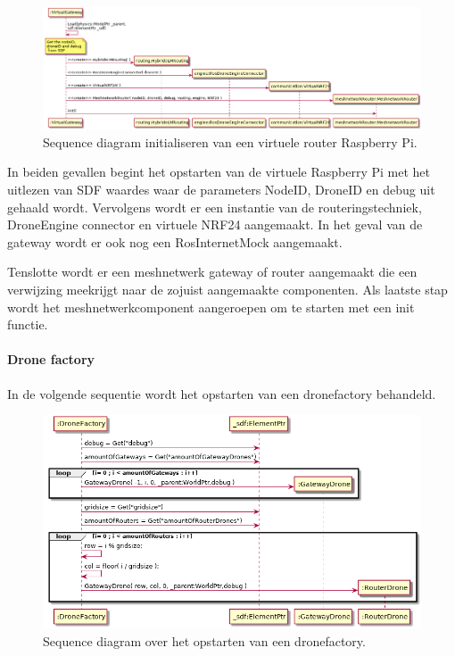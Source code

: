\documentclass[a4paper, 11pt, oneside]{report}
\begin{document}
\begin{figure}[H]
	\begin{center}\includegraphics[width=.90\linewidth]{UML/out/DroneSimulation/Sequence/VirtualRouter/VirtualRouter.png}\end{center}
	\caption{Sequence diagram initialiseren van een virtuele router Raspberry Pi.}
	\label{fig:communication:MeshNetwerk:sequence:routerRaspberryPi}
\end{figure}

In beiden gevallen begint het opstarten van de virtuele Raspberry Pi met het uitlezen van SDF waardes waar de parameters NodeID, DroneID en debug uit gehaald wordt.
Vervolgens wordt er een instantie van de routeringstechniek, DroneEngine connector en virtuele NRF24 aangemaakt.
In het geval van de gateway wordt er ook nog een RosInternetMock aangemaakt.

Tenslotte wordt er een meshnetwerk gateway of router aangemaakt die een verwijzing meekrijgt naar de zojuist aangemaakte componenten.
Als laatste stap wordt het meshnetwerkcomponent aangeroepen om te starten met een init functie.

\paragraph{Drone factory}
\label{DetailedDesign:MeshNetwerk:sequence:dronefactory}
In de volgende sequentie wordt het opstarten van een dronefactory behandeld.   

\begin{figure}[H]
	\begin{center}\includegraphics[width=.90\linewidth]{UML/out/DroneSimulation/Sequence/DroneFactory/DroneFactory.png}\end{center}
	\caption{Sequence diagram over het opstarten van een dronefactory.}
	\label{fig:communication:MeshNetwerk:sequence:dronefactory}
\end{figure}
\end{document}
